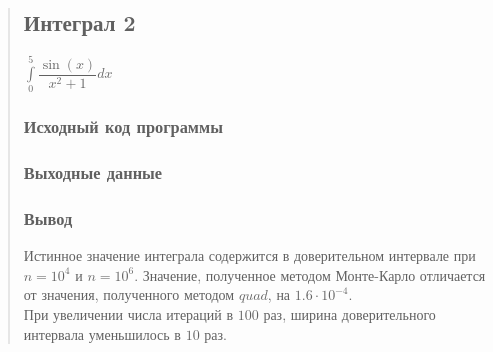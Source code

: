 \documentclass{article}
\begin{document}
\begin{quote}
\subsection{Интеграл 2}
	${\displaystyle \int\limits_{0}^{5} \dfrac{\sin (x)}{x^2+1} dx}$
	\subsubsection{Исходный код программы}
        	\begin{minipage}{\linewidth}
        	    
        	\end{minipage}
	\subsubsection{Выходные данные}
		\begin{minipage}{\linewidth}
        	    
        	\end{minipage}
	\subsubsection{Вывод}
        	Истинное значение интеграла содержится в доверительном интервале при $n = 10^4$ и $n = 10^6$. Значение, полученное методом Монте-Карло отличается от значения, полученного методом $quad$, на $1.6 \cdot 10^{-4}$.\\
        	При увеличении числа итераций в $100$ раз, ширина доверительного интервала уменьшилось в $10$ раз.
\end{quote}
\end{document}

